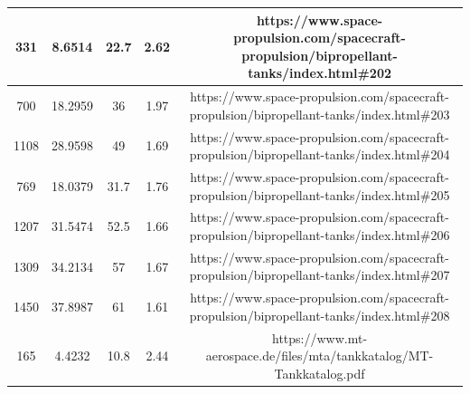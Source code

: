 \begin{table}[]
{\begin{tabular}{|ccccc|}
\multicolumn{1}{|c|}{331}                     & \multicolumn{1}{c|}{8.6514}                       & \multicolumn{1}{c|}{22.7}                        & \multicolumn{1}{c|}{2.62}                         & https://www.space-propulsion.com/spacecraft-propulsion/bipropellant-tanks/index.html\#202                        \\ \hline
\multicolumn{1}{|c|}{700}                     & \multicolumn{1}{c|}{18.2959}                      & \multicolumn{1}{c|}{36}                          & \multicolumn{1}{c|}{1.97}                         & https://www.space-propulsion.com/spacecraft-propulsion/bipropellant-tanks/index.html\#203                        \\ \hline
\multicolumn{1}{|c|}{1108}                    & \multicolumn{1}{c|}{28.9598}                      & \multicolumn{1}{c|}{49}                          & \multicolumn{1}{c|}{1.69}                         & https://www.space-propulsion.com/spacecraft-propulsion/bipropellant-tanks/index.html\#204                        \\ \hline
\multicolumn{1}{|c|}{769}                     & \multicolumn{1}{c|}{18.0379}                      & \multicolumn{1}{c|}{31.7}                        & \multicolumn{1}{c|}{1.76}                         & https://www.space-propulsion.com/spacecraft-propulsion/bipropellant-tanks/index.html\#205                        \\ \hline
\multicolumn{1}{|c|}{1207}                    & \multicolumn{1}{c|}{31.5474}                      & \multicolumn{1}{c|}{52.5}                        & \multicolumn{1}{c|}{1.66}                         & https://www.space-propulsion.com/spacecraft-propulsion/bipropellant-tanks/index.html\#206                        \\ \hline
\multicolumn{1}{|c|}{1309}                    & \multicolumn{1}{c|}{34.2134}                      & \multicolumn{1}{c|}{57}                          & \multicolumn{1}{c|}{1.67}                         & https://www.space-propulsion.com/spacecraft-propulsion/bipropellant-tanks/index.html\#207                        \\ \hline
\multicolumn{1}{|c|}{1450}                    & \multicolumn{1}{c|}{37.8987}                      & \multicolumn{1}{c|}{61}                          & \multicolumn{1}{c|}{1.61}                         & https://www.space-propulsion.com/spacecraft-propulsion/bipropellant-tanks/index.html\#208                        \\ \hline
\multicolumn{1}{|c|}{165}                     & \multicolumn{1}{c|}{4.4232}                       & \multicolumn{1}{c|}{10.8}                        & \multicolumn{1}{c|}{2.44}                         & https://www.mt-aerospace.de/files/mta/tankkatalog/MT-Tankkatalog.pdf                                             \\ \hline

\end{tabular}}
\end{table}
